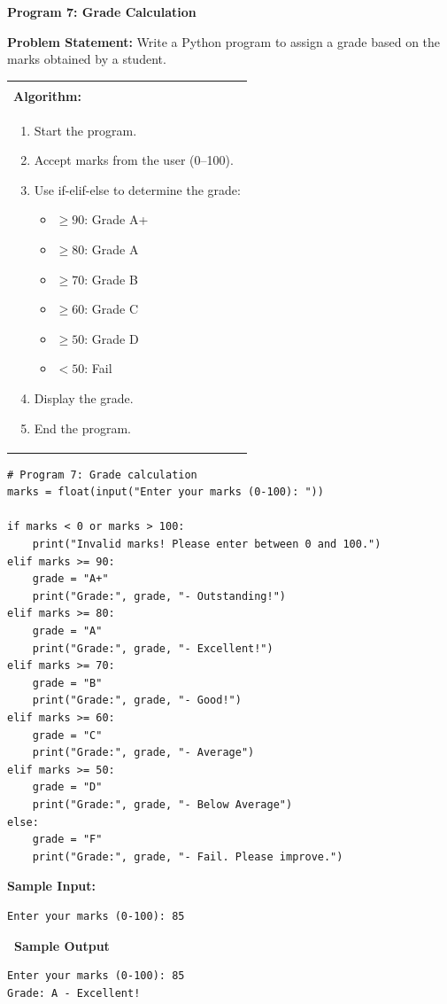 \documentclass[12pt,a4paper]{article}
\makeatletter
\newcommand{\outhead}{\noindent\colorbox{cmrgreen!25}%
  {\textbf{\small\color{cmrdark}~Sample Output~}}\par\vspace{-1pt}}
\newenvironment{algobox}{%
  \par\vspace{4pt}%
  \noindent\begin{tabular}{@{}p{\linewidth}@{}}%
  \hline\\[-8pt]%
  \textbf{\color{blue!60!black}\small Algorithm:}\\[2pt]%
}{%
  \\[-4pt]\hline%
  \end{tabular}\par\vspace{4pt}%
}
\makeatother
\begin{document}
\vspace{0.5cm}

\textbf{Program 7: Grade Calculation}

\textbf{Problem Statement:}
Write a Python program to assign a grade based on the marks obtained by a student.

\begin{algobox}
\begin{enumerate}[label=Step \arabic*:]
  \item Start the program.
  \item Accept marks from the user (0--100).
  \item Use if-elif-else to determine the grade:
    \begin{itemize}
      \item $\geq 90$: Grade A+
      \item $\geq 80$: Grade A
      \item $\geq 70$: Grade B
      \item $\geq 60$: Grade C
      \item $\geq 50$: Grade D
      \item $< 50$: Fail
    \end{itemize}
  \item Display the grade.
  \item End the program.
\end{enumerate}
\end{algobox}

\begin{lstlisting}
# Program 7: Grade calculation
marks = float(input("Enter your marks (0-100): "))

if marks < 0 or marks > 100:
    print("Invalid marks! Please enter between 0 and 100.")
elif marks >= 90:
    grade = "A+"
    print("Grade:", grade, "- Outstanding!")
elif marks >= 80:
    grade = "A"
    print("Grade:", grade, "- Excellent!")
elif marks >= 70:
    grade = "B"
    print("Grade:", grade, "- Good!")
elif marks >= 60:
    grade = "C"
    print("Grade:", grade, "- Average")
elif marks >= 50:
    grade = "D"
    print("Grade:", grade, "- Below Average")
else:
    grade = "F"
    print("Grade:", grade, "- Fail. Please improve.")
\end{lstlisting}

\textbf{Sample Input:}
\begin{verbatim}
Enter your marks (0-100): 85
\end{verbatim}

\outhead
\begin{lstlisting}[style=outputstyle]
Enter your marks (0-100): 85
Grade: A - Excellent!
\end{lstlisting}
\end{document}
